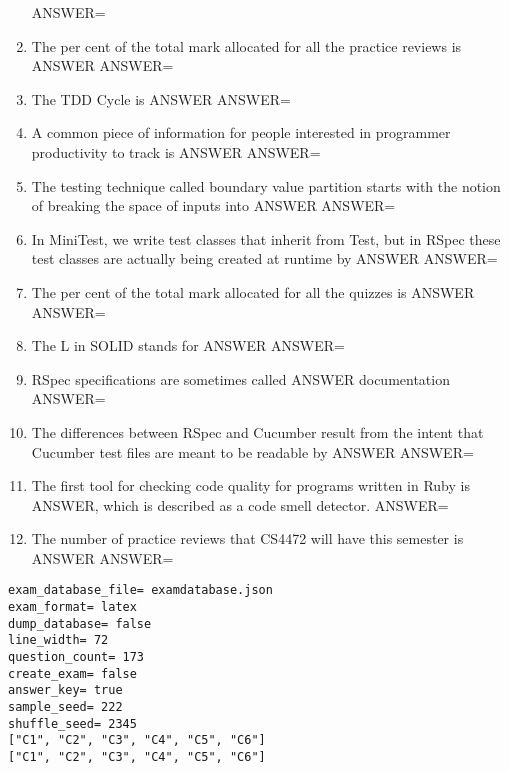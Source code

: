 \documentclass{exam}
\begin{document}
\begin{enumerate}
ANSWER=
\item The per cent of the total mark allocated for all the practice reviews is ANSWER\newline
ANSWER=
\item The TDD Cycle is ANSWER\newline
ANSWER=
\item A common piece of information for people interested in programmer productivity to track is ANSWER\newline
ANSWER=
\item The testing technique called boundary value partition starts with the notion of breaking the space of inputs into ANSWER\newline
ANSWER=
\item In MiniTest, we write test classes that inherit from Test, but in RSpec these test classes are actually being created at runtime by ANSWER\newline
ANSWER=
\item The per cent of the total mark allocated for all the quizzes is ANSWER\newline
ANSWER=
\item The L in SOLID stands for ANSWER\newline
ANSWER=
\item RSpec specifications are sometimes called ANSWER documentation\newline
ANSWER=
\item The differences between RSpec and Cucumber result from the intent that Cucumber test files are meant to be readable by ANSWER\newline
ANSWER=
\item The first tool for checking code quality for programs written in Ruby is ANSWER, which is described as a code smell detector.\newline
ANSWER=
\item The number of practice reviews that CS4472 will have this semester is ANSWER\newline
ANSWER=
\end{enumerate}
\newpage
\begin{verbatim}
exam_database_file= examdatabase.json
exam_format= latex
dump_database= false
line_width= 72
question_count= 173
create_exam= false
answer_key= true
sample_seed= 222
shuffle_seed= 2345
["C1", "C2", "C3", "C4", "C5", "C6"]
["C1", "C2", "C3", "C4", "C5", "C6"]
\end{verbatim}
\end{document}

